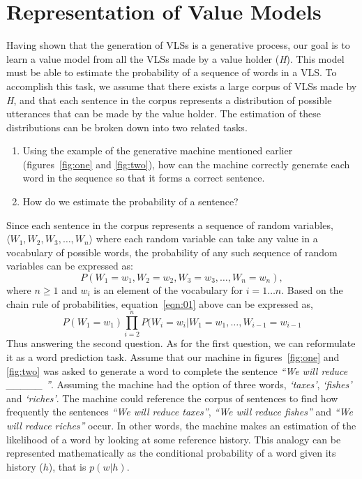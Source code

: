 \section{Representation of Value Models}
Having shown that the generation of VLSs is a generative process, our goal is to learn a value model from all the VLSs made by a value holder (\emph{H}). This model must be able to estimate the probability of a sequence of words in a VLS. To accomplish this task, we assume that there exists a large corpus of VLSs made by \emph{H}, and that each sentence in the corpus represents a distribution of possible utterances that can be made by the value holder. The estimation of these distributions can be broken down into two related tasks.
\begin{enumerate}
\item
Using the example of the generative machine mentioned earlier (figures~\ref{fig:one} and \ref{fig:two}), how can the machine correctly generate each word in the sequence so that it forms a correct sentence. 
\item
How do we estimate the probability of a sentence?
\end{enumerate}
Since each sentence in the corpus represents a sequence of random variables, $\langle W_1, W_2,W_3, \ldots ,W_n \rangle$   where each random variable can take any value in a vocabulary of possible words, the probability of any such sequence of random variables can be expressed as:
\begin{equation}
\label{eqn:01}
P(W_1 = w_1,W_2= w_2,W_3= w_3,\ldots,W_n= w_n),
\end{equation}
where $n \geq 1$ and $w_i$ is an element of the vocabulary for $i = 1 \ldots n$. 
\noindent Based on the chain rule of probabilities, equation~\ref{eqn:01} above can be expressed as,
\begin{equation}
\label{eqn:02}
P(W_1=w_1)\prod_{i=2}^{n}P(W_i=w_i|W_1=w_1,\ldots,W_{i-1}=w_{i-1}
\end{equation}
\noindent Thus answering the second question. As for the first question, we can reformulate it as a word prediction task. Assume that our machine in figures~\ref{fig:one} and \ref{fig:two} was asked to generate a word to complete the sentence \textit{``We will reduce \_\_\_\_\_ ''}. Assuming the machine had the option of three words, \textit{`taxes'}, \textit{`fishes'} and \textit{`riches'}. The machine could reference the corpus of sentences to find how frequently the sentences \textit{``We will reduce taxes''}, \textit{``We will reduce fishes''} and \textit{``We will reduce riches''} occur. In other words, the machine makes an estimation of the likelihood of a word by looking at some reference history. This analogy can be represented mathematically as the conditional probability of a word given its history ($h$), that is $p(w|h)$.

